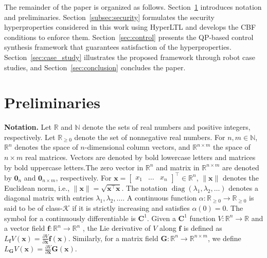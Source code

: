 \documentclass[journal,twoside,web]{ieeecolor}
\begin{document}
The remainder of the paper is organized as follows.
Section~\ref{sec:preliminaries} introduces notation and preliminaries. 
Section~\ref{subsec:security} formulates the security hyperproperties considered in this work using HyperLTL and develops the CBF conditions to enforce them. 
Section~\ref{sec:control} presents the QP-based control synthesis framework that guarantees satisfaction of the hyperproperties.
Section~\ref{sec:case_study} illustrates the proposed framework through robot case studies, and Section~\ref{sec:conclusion} concludes the paper.

\section{Preliminaries}
\label{sec:preliminaries}

\textbf{Notation.} Let $\mathbb{R}$ and $\mathbb{N}$ denote the sets of real numbers and positive integers, respectively. Let $\mathbb{R}_{\ge 0}$ denote the set of nonnegative real numbers. For $n, m \in \mathbb{N}$, $\mathbb{R}^n$ denotes the space of $n$-dimensional column vectors, and $\mathbb{R}^{n \times m}$ the space of $n \times m$ real matrices. Vectors are denoted by bold lowercase letters and matrices by bold uppercase letters.The zero vector in $\mathbb{R}^n$ and matrix in $\mathbb{R}^{n \times m}$ are denoted by $\mathbf{0}_n$ and $\mathbf{0}_{n \times m}$, respectively. For $\mathbf{x} = \begin{bmatrix} x_1 & \dots & x_n \end{bmatrix}^\top \in \mathbb{R}^n$, $\|\mathbf{x}\|$ denotes the Euclidean norm, i.e., $\|\mathbf{x}\| = \sqrt{\mathbf{x}^\top \mathbf{x}}$. The notation $\operatorname{diag}(\lambda_1, \lambda_2, \dots)$ denotes a diagonal matrix with entries $\lambda_1, \lambda_2, \dots$. A continuous function $\alpha: \mathbb{R}_{\ge 0} \to \mathbb{R}_{\ge 0}$ is said to be of class-$\mathcal{K}$ if it is strictly increasing and satisfies $\alpha(0) = 0$. The symbol for a continuously differentiable is $\mathbf{C}^1$. Given a $\mathbf{C}^1$ function $V : \mathbb{R}^n \to \mathbb{R}$ and a vector field $\mathbf{f} : \mathbb{R}^n \to \mathbb{R}^n$ , the Lie derivative of $V$ along $\mathbf{f}$ is defined as $L_\mathbf{f} V(\mathbf{x}) = \tfrac{\partial V}{\partial \mathbf{x}} \mathbf{f}(\mathbf{x})$. Similarly, for a matrix field $\mathbf{G} : \mathbb{R}^n \to \mathbb{R}^{n \times m}$, we define
$L_{\mathbf{G}}V(\mathbf{x}) = \frac{\partial V}{\partial \mathbf{x}} \mathbf{G}(\mathbf{x})$.
\end{document}
